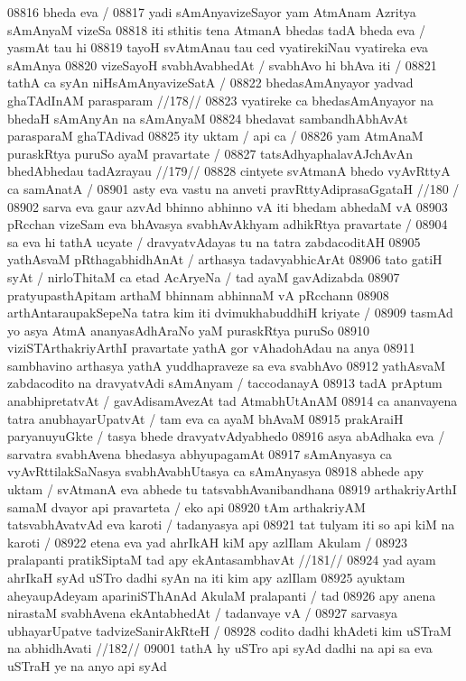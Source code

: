 08816 	bheda eva /
08817 yadi sAmAnyavizeSayor yam AtmAnam Azritya sAmAnyaM vizeSa
08818 iti sthitis tena AtmanA bhedas tadA bheda eva / yasmAt tau hi
08819 tayoH svAtmAnau tau ced vyatirekiNau vyatireka eva sAmAnya  
08820 vizeSayoH svabhAvabhedAt / svabhAvo hi bhAva iti / 
08821 	tathA ca syAn niHsAmAnyavizeSatA /
08822 	bhedasAmAnyayor yadvad ghaTAdInAM parasparam //178//
08823 vyatireke ca bhedasAmAnyayor na bhedaH sAmAnyAn na sAmAnyaM 
08824 bhedavat sambandhAbhAvAt parasparaM ghaTAdivad 
08825 ity uktam / api ca /
08826 	yam AtmAnaM puraskRtya puruSo ayaM pravartate /  
08827 	tatsAdhyaphalavAJchAvAn bhedAbhedau tadAzrayau //179// 
08828 	cintyete svAtmanA bhedo vyAvRttyA ca samAnatA /
08901 	asty eva vastu na anveti pravRttyAdiprasaGgataH //180 /  
08902 sarva eva gaur azvAd bhinno abhinno vA iti bhedam abhedaM vA  
08903 pRcchan vizeSam eva bhAvasya svabhAvAkhyam adhikRtya pravartate / 
08904 sa eva hi tathA ucyate / dravyatvAdayas tu na tatra zabdacoditAH 
08905 yathAsvaM pRthagabhidhAnAt / arthasya tadavyabhicArAt  
08906 tato gatiH syAt / nirloThitaM ca etad AcAryeNa / tad ayaM gavAdizabda
08907 pratyupasthApitam arthaM bhinnam abhinnaM vA pRcchann 
08908 arthAntaraupakSepeNa tatra kim iti dvimukhabuddhiH kriyate / 
08909 tasmAd yo asya AtmA ananyasAdhAraNo yaM puraskRtya puruSo  
08910 viziSTArthakriyArthI pravartate yathA gor vAhadohAdau na anya
08911 sambhavino arthasya yathA yuddhapraveze sa eva svabhAvo 
08912 yathAsvaM zabdacodito na dravyatvAdi sAmAnyam / taccodanayA
08913 tadA prAptum anabhipretatvAt / gavAdisamAvezAt tad AtmabhUtAnAM
08914 ca ananvayena tatra anubhayarUpatvAt / tam eva ca ayaM bhAvaM
08915 prakAraiH paryanuyuGkte / tasya bhede dravyatvAdyabhedo  
08916 asya abAdhaka eva / sarvatra svabhAvena bhedasya abhyupagamAt 
08917 sAmAnyasya ca vyAvRttilakSaNasya svabhAvabhUtasya ca sAmAnyasya  
08918 abhede apy uktam / svAtmanA eva abhede tu tatsvabhAvanibandhana  
08919 arthakriyArthI  samaM dvayor api pravarteta / eko api  
08920 tAm arthakriyAM tatsvabhAvatvAd eva karoti / tadanyasya api
08921 tat tulyam iti so api kiM na karoti / 
08922 	etena eva yad ahrIkAH kiM apy azlIlam Akulam / 
08923 	pralapanti pratikSiptaM tad apy ekAntasambhavAt //181//  
08924 yad ayam ahrIkaH syAd uSTro dadhi syAn na iti kim apy azlIlam
08925 ayuktam aheyaupAdeyam apariniSThAnAd AkulaM pralapanti / tad
08926 apy anena nirastaM svabhAvena ekAntabhedAt / tadanvaye vA /
08927 	sarvasya ubhayarUpatve tadvizeSanirAkRteH /
08928 	codito dadhi khAdeti kim uSTraM na abhidhAvati //182// 
09001 tathA hy uSTro api syAd dadhi na api sa eva uSTraH ye na anyo api syAd 
